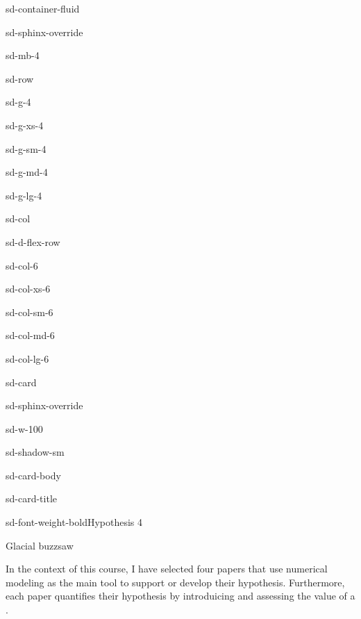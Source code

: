 \documentclass[letterpaper,10pt,english]{jupyterBook}
\let\sphinxpxdimen\pdfpxdimen\else\newdimen\sphinxpxdimen
\begin{document}
\begin{sphinxuseclass}{sd-container-fluid}
\begin{sphinxuseclass}{sd-sphinx-override}
\begin{sphinxuseclass}{sd-mb-4}
\begin{sphinxuseclass}{sd-row}
\begin{sphinxuseclass}{sd-g-4}
\begin{sphinxuseclass}{sd-g-xs-4}
\begin{sphinxuseclass}{sd-g-sm-4}
\begin{sphinxuseclass}{sd-g-md-4}
\begin{sphinxuseclass}{sd-g-lg-4}
\begin{sphinxuseclass}{sd-col}
\begin{sphinxuseclass}{sd-d-flex-row}
\begin{sphinxuseclass}{sd-col-6}
\begin{sphinxuseclass}{sd-col-xs-6}
\begin{sphinxuseclass}{sd-col-sm-6}
\begin{sphinxuseclass}{sd-col-md-6}
\begin{sphinxuseclass}{sd-col-lg-6}
\begin{sphinxuseclass}{sd-card}
\begin{sphinxuseclass}{sd-sphinx-override}
\begin{sphinxuseclass}{sd-w-100}
\begin{sphinxuseclass}{sd-shadow-sm}
\begin{sphinxuseclass}{sd-card-body}
\begin{sphinxuseclass}{sd-card-title}
\begin{sphinxuseclass}{sd-font-weight-bold}Hypothesis 4
\end{sphinxuseclass}
\end{sphinxuseclass}
\sphinxAtStartPar
Glacial buzzsaw

\noindent{\hspace*{\fill}\sphinxincludegraphics[width=200\sphinxpxdimen]{{egholmetal2009}.png}\hspace*{\fill}}

\sphinxAtStartPar
{}

\end{sphinxuseclass}
\end{sphinxuseclass}
\end{sphinxuseclass}
\end{sphinxuseclass}
\end{sphinxuseclass}
\end{sphinxuseclass}
\end{sphinxuseclass}
\end{sphinxuseclass}
\end{sphinxuseclass}
\end{sphinxuseclass}
\end{sphinxuseclass}
\end{sphinxuseclass}
\end{sphinxuseclass}
\end{sphinxuseclass}
\end{sphinxuseclass}
\end{sphinxuseclass}
\end{sphinxuseclass}
\end{sphinxuseclass}
\end{sphinxuseclass}
\end{sphinxuseclass}
\end{sphinxuseclass}
\sphinxAtStartPar
In the context of this course, I have selected four papers that use numerical modeling as the main tool to support or develop their hypothesis. Furthermore, each paper quantifies their hypothesis by introduicing and assessing the value of a .
\end{document}
